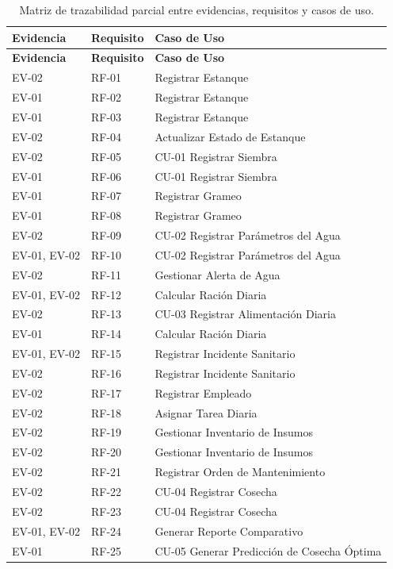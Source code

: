 \documentclass[11pt,a4paper]{article}
\begin{document}
\begin{longtable}{|p{3cm}|p{3cm}|p{4.5cm}|}
\caption{Matriz de trazabilidad parcial entre evidencias, requisitos y casos de uso.}
\label{tab:matriz-trazabilidad} \\
\hline
\textbf{Evidencia} & \textbf{Requisito} & \textbf{Caso de Uso} \\
\hline
\endfirsthead

\hline
\textbf{Evidencia} & \textbf{Requisito} & \textbf{Caso de Uso} \\
\hline
\endhead

\hline
\endfoot

\hline
\endlastfoot

EV-02 & RF-01 & Registrar Estanque \\
EV-01 & RF-02 & Registrar Estanque \\
EV-01 & RF-03 & Registrar Estanque \\
EV-02 & RF-04 & Actualizar Estado de Estanque \\
EV-02 & RF-05 & CU-01 Registrar Siembra \\
EV-01 & RF-06 & CU-01 Registrar Siembra \\
EV-01 & RF-07 & Registrar Grameo \\
EV-01 & RF-08 & Registrar Grameo \\
EV-02 & RF-09 & CU-02 Registrar Parámetros del Agua \\
EV-01, EV-02 & RF-10 & CU-02 Registrar Parámetros del Agua \\
EV-02 & RF-11 & Gestionar Alerta de Agua \\
EV-01, EV-02 & RF-12 & Calcular Ración Diaria \\
EV-02 & RF-13 & CU-03 Registrar Alimentación Diaria \\
EV-01 & RF-14 & Calcular Ración Diaria \\
EV-01, EV-02 & RF-15 & Registrar Incidente Sanitario \\
EV-02 & RF-16 & Registrar Incidente Sanitario \\
EV-02 & RF-17 & Registrar Empleado \\
EV-02 & RF-18 & Asignar Tarea Diaria \\
EV-02 & RF-19 & Gestionar Inventario de Insumos \\
EV-02 & RF-20 & Gestionar Inventario de Insumos \\
EV-02 & RF-21 & Registrar Orden de Mantenimiento \\
EV-02 & RF-22 & CU-04 Registrar Cosecha \\
EV-02 & RF-23 & CU-04 Registrar Cosecha \\
EV-01, EV-02 & RF-24 & Generar Reporte Comparativo \\
EV-01 & RF-25 & CU-05 Generar Predicción de Cosecha Óptima \\
\hline

\end{longtable}
\end{document}
